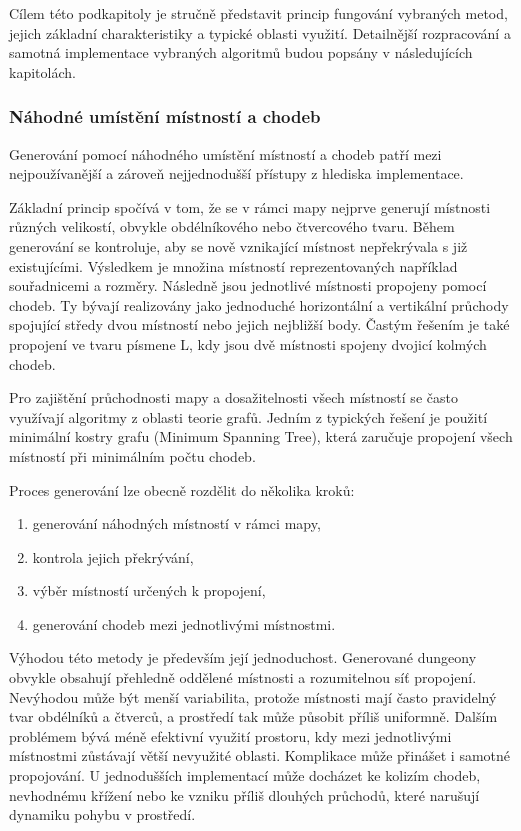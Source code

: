 \documentclass[
  program=itk,
  biblatex,
  figures=false,
  glossaries,
  index
]{kidiplom}
\begin{document}
Cílem této podkapitoly je stručně představit princip fungování vybraných metod, jejich základní charakteristiky a typické oblasti využití. Detailnější rozpracování a samotná implementace vybraných algoritmů budou popsány v následujících kapitolách.

\subsubsection{Náhodné umístění místností a chodeb}
Generování pomocí náhodného umístění místností a chodeb patří mezi nejpoužívanější a zároveň nejjednodušší přístupy z hlediska implementace.

Základní princip spočívá v tom, že se v rámci mapy nejprve generují místnosti různých velikostí, obvykle obdélníkového nebo čtvercového tvaru. Během generování se kontroluje, aby se nově vznikající místnost nepřekrývala s již existujícími. Výsledkem je množina místností reprezentovaných například souřadnicemi a rozměry. Následně jsou jednotlivé místnosti propojeny pomocí chodeb. Ty bývají realizovány jako jednoduché horizontální a vertikální průchody spojující středy dvou místností nebo jejich nejbližší body. Častým řešením je také propojení ve tvaru písmene L, kdy jsou dvě místnosti spojeny dvojicí kolmých chodeb.

Pro zajištění průchodnosti mapy a dosažitelnosti všech místností se často využívají algoritmy z oblasti teorie grafů. Jedním z typických řešení je použití minimální kostry grafu (Minimum Spanning Tree), která zaručuje propojení všech místností při minimálním počtu chodeb.

Proces generování lze obecně rozdělit do několika kroků:
\begin{enumerate}
\item generování náhodných místností v rámci mapy,
\item kontrola jejich překrývání,
\item výběr místností určených k propojení,
\item generování chodeb mezi jednotlivými místnostmi.
\end{enumerate}

Výhodou této metody je především její jednoduchost. Generované dungeony obvykle obsahují přehledně oddělené místnosti a rozumitelnou síť propojení. Nevýhodou může být menší variabilita, protože místnosti mají často pravidelný tvar obdélníků a čtverců, a prostředí tak může působit příliš uniformně. Dalším problémem bývá méně efektivní využití prostoru, kdy mezi jednotlivými místnostmi zůstávají větší nevyužité oblasti. Komplikace může přinášet i samotné propojování. U jednodušších implementací může docházet ke kolizím chodeb, nevhodnému křížení nebo ke vzniku příliš dlouhých průchodů, které narušují dynamiku pohybu v prostředí.
\end{document}
